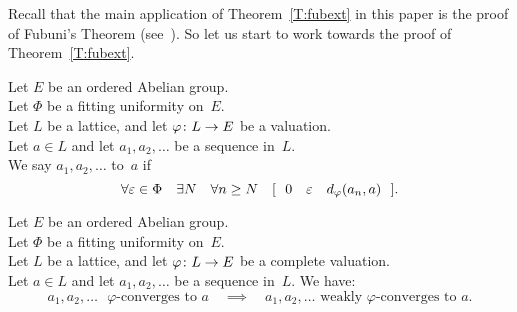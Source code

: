 \documentclass[main.tex]{subfiles}
\begin{document}
Recall that the  main application of Theorem~\ref{T:fubext} in this paper
is the proof of Fubuni's Theorem (see~).
So let us start to work towards the proof of Theorem~\ref{T:fubext}.
%
%
\begin{dfn}
\label{D:weak-phi-conv}
Let $E$ be an ordered Abelian group.\\
Let $\Phi$ be a fitting uniformity on~$E$.\\
Let $L$ be a lattice, and let $\varphi\colon L \rightarrow E$ be a valuation.\\
Let $a \in L$ and let $a_1,a_2,\dotsc$ be a sequence in~$L$.\\
We say $a_1,a_2,\dotsc$ 
 to~$a$
if
\begin{equation*}
\forall \varepsilon \in \Phi \quad \exists N \quad \forall n \geq N \quad
[\ \ 0\quad\varepsilon\quad d_{\smash{\varphi}}(a_n,a)  \ \ ].
\end{equation*}
\end{dfn}
%
%
\begin{lem}
\label{L:weak-phi-conv-implies-phi-conv}
Let $E$ be an ordered Abelian group.\\
Let $\Phi$ be a fitting uniformity on~$E$.\\
Let $L$ be a lattice, and let $\varphi\colon L \rightarrow E$ be a complete valuation.\\
Let $a \in L$ and let $a_1,a_2,\dotsc$ be a sequence in~$L$. We have:
\begin{equation*}
\text{$a_1,a_2,\dotsc$ $\varphi$-converges to~$a$}
\quad\implies\quad
\text{$a_1,a_2,\dotsc$ weakly $\varphi$-converges to~$a$}.
\end{equation*}
\end{lem}
\end{document}
